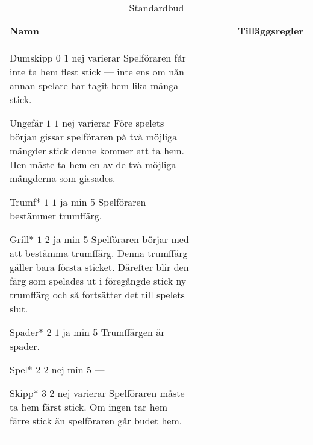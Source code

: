 %
%
%
%

\begin{table}
	\caption{Standardbud}\label{tab:standardBids}
	\begin{center}
		\begin{tabularx}{\textwidth}{lcccc|X}
				\textbf{Namn} &
				\rotccw{\textbf{Värde}} &
				\rotccw{\textbf{Poäng}} &
				\rotccw{\textbf{Trumf}} &
				\rotccw{\textbf{Stick}} &
				\textbf{Tilläggsregler}
				\\[-3ex]

				\standardBidItem%
				{Dumskipp}
				{$0$}
				{$1$}
				{nej}
				{varierar}
				{%
					Spelföraren får inte ta hem flest stick --- inte ens om nån annan spelare har tagit hem lika många stick.
				}

				\standardBidItem%
				{Ungefär}
				{$1$}
				{$1$}
				{nej}
				{varierar}
				{%
					Före spelets början gissar spelföraren på två möjliga mängder stick denne kommer att ta hem. Hen måste ta hem en av de två möjliga mängderna som gissades.
				}

				\standardBidItem%
				{Trumf*}
				{$1$}
				{$1$}
				{ja}
				{min 5}
				{%
					Spelföraren bestämmer trumffärg.
				}

				\standardBidItem%
				{Grill*}
				{$1$}
				{$2$}
				{ja}
				{min 5}
				{%
					Spelföraren börjar med att bestämma trumffärg. Denna trumffärg gäller bara första sticket. Därefter blir den färg som spelades ut i föregångde stick ny trumffärg och så fortsätter det till spelets slut.
				}
				
				\standardBidItem%
				{Spader*}
				{$2$}
				{$1$}
				{ja}
				{min 5}
				{%
					Trumffärgen är spader.
				}

				\standardBidItem%
				{Spel*}
				{$2$}
				{$2$}
				{nej}
				{min 5}
				{%
					---
				}

				\standardBidItem%
				{Skipp*}
				{$3$}
				{$2$}
				{nej}
				{varierar}
				{%
					Spelföraren måste ta hem färst stick. Om ingen tar hem färre stick än spelföraren går budet hem.
				}


\end{tabularx}
\end{center}
\end{table}

